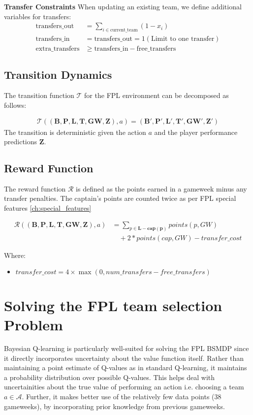 \textbf{Transfer Constraints}
When updating an existing team, we define additional variables for transfers:
\begin{align}
    \text{transfers\_out} &= \sum_{i \in \text{current\_team}} (1 - x_i) \\
    \text{transfers\_in} &= \text{transfers\_out} = 1 (\text{Limit to one transfer})\\
    \text{extra\_transfers} &\geq \text{transfers\_in} - \text{free\_transfers}
\end{align}

\subsection{Transition Dynamics}

The transition function $\mathcal{T}$ for the FPL environment can be decomposed as follows:

\begin{align}
    \mathcal{T}((\mathbf{B}, \mathbf{P}, \mathbf{L}, \mathbf{T}, \mathbf{GW}, \mathbf{Z}), a) = (\mathbf{B}', \mathbf{P}', \mathbf{L}', \mathbf{T}', \mathbf{GW}', \mathbf{Z}')
\end{align}
The transition is deterministic given the action $a$ and the player performance predictions $\mathbf{Z}$.

\subsection{Reward Function}

The reward function $\mathcal{R}$ is defined as the points earned in a gameweek minus any transfer penalties. The captain's points are counted twice as per FPL special features \ref{ch:special_features}

\begin{align}
\mathcal{R}((\mathbf{B}, \mathbf{P}, \mathbf{L}, \mathbf{T}, \mathbf{GW}, \mathbf{Z}), a) &= \sum_{p \in \mathbf{L - cap(p)}} points(p, GW) \nonumber \\
&\quad + 2*points(cap, GW) - transfer\_cost
\end{align}

Where:
\begin{itemize}
    \item $transfer\_cost = 4 \times \max(0, num\_transfers - free\_transfers)$
\end{itemize}


\section{Solving the FPL team selection Problem}
Bayesian Q-learning is particularly well-suited for solving the FPL BSMDP since it directly incorporates uncertainty about the value function itself. Rather than maintaining a point estimate of Q-values as in standard Q-learning, it maintains a probability distribution over possible Q-values. This helps deal with uncertainities about the true value of performing an action i.e. choosing a team $a \in \mathcal{A}$. Further, it makes better use of the relatively few data points (38 gameweeks), by incorporating prior knowledge from previous gameweeks.


